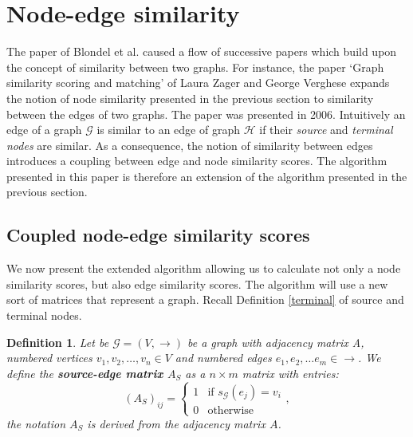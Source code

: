 \documentclass[a4paper,11pt]{report}
\newtheorem{definition}[theorem]{Definition}
\newcommand{\graf}{\mathscr{G}}
\newcommand{\grafeen}{\mathscr{H}}
\begin{document}
\section{Node-edge similarity}
The paper of Blondel et al. \cite{blondel} caused a flow of successive papers 
which build upon the concept of similarity between two graphs. For instance, the paper
`Graph similarity scoring and 
matching' of Laura Zager and George Verghese \cite{zager} expands the 
notion of node similarity presented in the previous section to similarity 
between the edges of two graphs. The paper was presented in 2006. Intuitively an 
edge of a graph $\graf$ is similar to an edge of graph $\grafeen$ if their 
\emph{source} and \emph{terminal nodes} are similar. As a consequence, the notion of similarity between edges
introduces a coupling between edge and node similarity scores. The algorithm presented in 
this paper is therefore an extension of the algorithm presented in the previous section.

\subsection{Coupled node-edge similarity scores}
We now present the extended algorithm allowing us to calculate not only a node 
similarity scores, but also edge similarity scores. The algorithm will use a 
new sort of matrices that represent a graph. Recall Definition \ref{terminal} of 
source and terminal nodes.


\begin{definition}
  Let be $\graf=(V,\to)$ be a graph with adjacency matrix A, numbered vertices $v_1, v_2, \ldots, v_n \in V$ 
  and numbered edges $e_1, e_2, \ldots e_m  \in \to$. We define the \textbf{source-edge matrix $A_S$} as a $n\times m$ matrix with entries:
  $$(A_S)_{ij} = \begin{cases} 1 &\mbox{if }s_\graf(e_j) = v_i   \\ 
0 & \mbox{otherwise} \end{cases},$$
the notation $A_S$ is derived from the adjacency matrix $A$.
  \end{definition}
  
\end{document}
